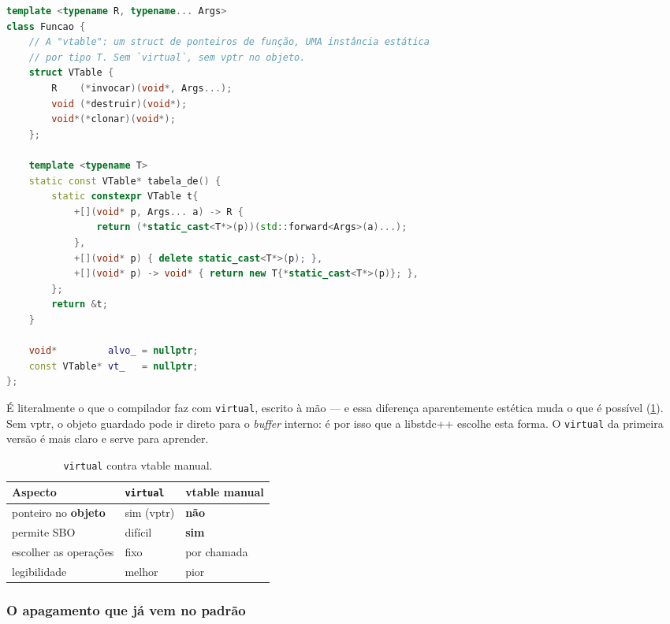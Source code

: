 \begin{lstlisting}[style=bt, language=C++,
    caption={A vtable escrita à mão (resumo de
             \texttt{src/type\_erasure/demo\_implementacao.hpp}).}]
template <typename R, typename... Args>
class Funcao {
    // A "vtable": um struct de ponteiros de função, UMA instância estática
    // por tipo T. Sem `virtual`, sem vptr no objeto.
    struct VTable {
        R    (*invocar)(void*, Args...);
        void (*destruir)(void*);
        void*(*clonar)(void*);
    };

    template <typename T>
    static const VTable* tabela_de() {
        static constexpr VTable t{
            +[](void* p, Args... a) -> R {
                return (*static_cast<T*>(p))(std::forward<Args>(a)...);
            },
            +[](void* p) { delete static_cast<T*>(p); },
            +[](void* p) -> void* { return new T{*static_cast<T*>(p)}; },
        };
        return &t;
    }

    void*         alvo_ = nullptr;
    const VTable* vt_   = nullptr;
};
\end{lstlisting}

É literalmente o que o compilador faz com \texttt{virtual}, escrito à mão --- e
essa diferença aparentemente estética muda o que é possível
(\cref{tab:vtable-manual}). Sem vptr, o objeto guardado pode ir direto para o
\emph{buffer} interno: é por isso que a libstdc++ escolhe esta forma. O
\texttt{virtual} da primeira versão é mais claro e serve para aprender.

\begin{table}[htbp]
\centering
\caption{\texttt{virtual} contra vtable manual.}
\label{tab:vtable-manual}
\footnotesize
\begin{tabular}{@{}lll@{}}
\toprule
\textbf{Aspecto} & \texttt{virtual} & \textbf{vtable manual} \\
\midrule
ponteiro no \textbf{objeto}   & sim (vptr) & \textbf{não} \\
permite SBO                   & difícil    & \textbf{sim} \\
escolher as operações         & fixo       & por chamada \\
legibilidade                  & melhor     & pior \\
\bottomrule
\end{tabular}
\end{table}

\subsubsection{O apagamento que já vem no padrão}

